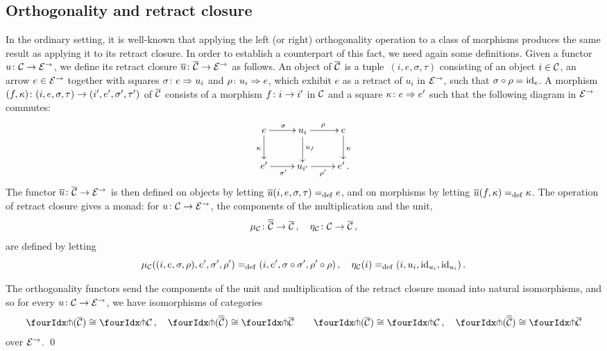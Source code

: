 \documentclass[reqno,10pt,a4paper,oneside]{amsart}
\begin{document}
\subsection*{Orthogonality and retract closure} In the ordinary setting, it is well-known that
applying the left (or right) orthogonality operation to a class of morphisms produces the same result as applying it to its retract closure. 
In order to establish a counterpart of this fact, we need again some definitions. 
Given a  functor $u \co \cal{C} \to \catE^{\to}$, we define its retract closure $\overline{u} \co \overline{\cal{C}} \to \catE^{\to}$ as follows. 
An object of $\overline{\cal{C}}$ is a tuple~$(i, e, \sigma, \tau)$ consisting of an object $i \in \cal{C}$, an arrow $e \in \cal{E}^\to$ together with squares $\sigma \co e \Rightarrow u_i$ and $\rho \co u_i \Rightarrow e$,
which exhibit $e$ as a retract of $u_i$ in  $\catE^{\to}$,  \ie such that $\sigma \cc \rho = \id_e$. 
A morphism $(f, \kappa) \co (i, e, \sigma, \tau) \to (i', e', \sigma', \tau')$ of $\overline{\cal{C}}$  consists of a morphism $f \co i \to i'$ in $\cal{C}$ and a square $\kappa \co e \Rightarrow e'$  such that the following diagram in $\cal{E}^\to$ commutes:
\[
\xymatrix{
  e
  \ar[r]^{\sigma}
    \ar[d]_{\kappa}
&
  u_i
  \ar[r]^{\rho}
  \ar[d]^{u_f}
&
  e
  \ar[d]^{\kappa}
\\
  e'
  \ar[r]_{\sigma'}
&
  u_{i'}
  \ar[r]_{\rho'}
&
  e' \, .
}
\]
The functor $\overline{u} \co \overline{\cal{C}} \to \catE^\to$ is then defined  on objects  by letting 
$\overline{u}(i, e, \sigma, \tau) \defeq e$,
and on morphisms by letting $\overline{u}(f, \kappa) \defeq \kappa$. The operation of retract closure gives a monad: for $u \co \cal{C} \to \catE^{\to}$,
the components of the multiplication and the unit, 
\[
\mu_\cal{C} \co \overline{\overline{\cal{C}}} \to \overline{\cal{C}} \, , \quad
\eta_\cal{C} \co \cal{C} \to \overline{\cal{C}} \, ,
\]
are defined by letting
\[
\mu_\cal{C}((i, e, \sigma,  \rho), e', \sigma', \rho') \defeq (i, e', \sigma \cc \sigma', \rho' \cc \rho) \, , \quad
\eta_\cal{C}(i) \defeq (i, u_i, \id_{u_i}, \id_{u_i}) \, .
\]




\begin{proposition}
\label{retract-closure}
The orthogonality functors send the components of the unit and multiplication of the retract closure monad into natural
isomorphisms, and so for every $u \co \cal{C} \to \catE^\to$, we have isomorphisms of categories
\begin{gather*} 
 \liftr{(\overline{\cal{C}})} \iso \liftr{\cal{C}} \, , \quad
 \liftr{(\overline{\overline{\cal{C}}})} \iso \liftr{\overline{\cal{C}}}  \qquad
 \liftl{(\overline{\cal{C}})} \iso \liftl{\cal{C}} \, , \quad
 \liftl{(\overline{\overline{\cal{C}}})} \iso \liftl{\overline{\cal{C}}}
\end{gather*} 
over $\catE^\to$. \qed
\end{proposition}
\end{document}
